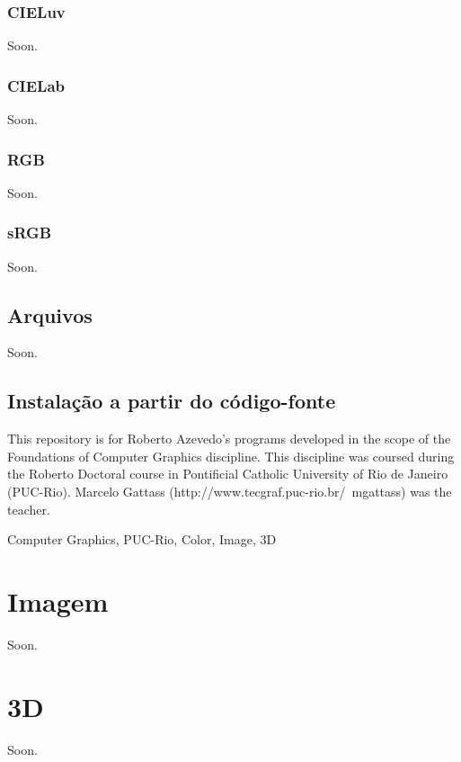 \documentclass[a4paper,10pt]{report}
\begin{document}
\subsection{CIELuv}
Soon.

\subsection{CIELab}
Soon.

\subsection{RGB}
Soon.

\subsection{sRGB}
Soon.

\section{Arquivos}
Soon.

\section{Instalação a partir do código-fonte}
This repository is for Roberto Azevedo's programs developed in the scope of the
Foundations of Computer Graphics discipline. This discipline was coursed during
the Roberto Doctoral course in Pontificial Catholic University of Rio de Janeiro
(PUC-Rio). Marcelo Gattass (http://www.tecgraf.puc-rio.br/~mgattass) was the
teacher.

Computer Graphics, PUC-Rio, Color, Image, 3D

\chapter{Imagem}
Soon.

\chapter{3D}
Soon.
\end{document}
